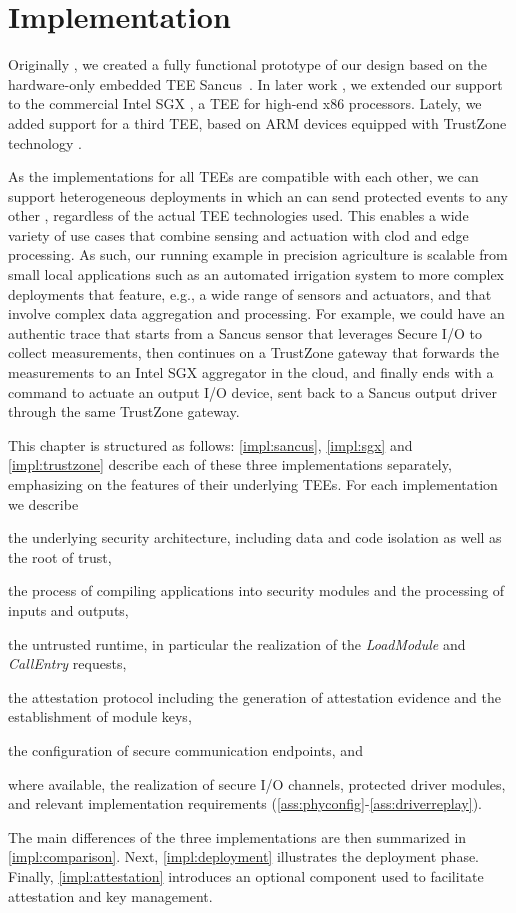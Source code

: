 \section{Implementation}
\label{sec:implementation}
%
Originally \cite{noorman:authentic-execution}, we created a fully functional
prototype of our design based on the hardware-only embedded \ac{TEE}
Sancus~\cite{sancus}. In later work \cite{scopelliti2020thesis}, we extended our
support to the commercial Intel \ac{SGX} \cite{sgx}, a \ac{TEE} for high-end x86
processors. Lately, we added support for a third \ac{TEE}, based on ARM devices
equipped with TrustZone technology \cite{alves:trustzone}.

As the implementations for all \acp{TEE} are compatible with each other, we can
support heterogeneous deployments in which an \protmod{} can send protected
events to any other \protmods{}, regardless of the actual \ac{TEE} technologies
used. This enables a wide variety of use cases that combine sensing and
actuation with clod and edge processing. As such, our running example in
precision agriculture is scalable from small local applications
such as an automated irrigation system to more complex deployments that
feature, e.g., a wide range of sensors and actuators, and that involve
complex data aggregation and processing. For example, we
could have an authentic trace that starts from a Sancus sensor that leverages
Secure I/O to collect measurements, then continues on a TrustZone gateway
that forwards the measurements to an Intel \ac{SGX} aggregator in the cloud, and
finally ends with a command to actuate an output I/O device, sent back to a
Sancus output driver through the same TrustZone gateway.

This chapter is structured as follows: \cref{impl:sancus}, \ref{impl:sgx} and
\ref{impl:trustzone} describe each of these three implementations separately,
emphasizing on the features of their underlying \acp{TEE}.  For each
implementation we describe
%
\begin{inparaenum}
\item the underlying security architecture, including data and code
  isolation as well as the root of trust,
\item the process of compiling applications into security modules and the
  processing of inputs and outputs,
\item the untrusted runtime, in particular the realization of the
  \emph{LoadModule} and \emph{CallEntry} requests,
\item the attestation protocol including the generation of attestation evidence
  and the establishment of module keys,
\item the configuration of secure communication endpoints, and
\item where available, the realization of secure I/O channels, protected
  driver modules, and relevant implementation
  requirements (\ref{ass:phyconfig}-\ref{ass:driverreplay}).
\end{inparaenum}
%
The main differences of the three implementations are then summarized in
\cref{impl:comparison}. Next, \cref{impl:deployment} illustrates the
deployment phase. Finally, \cref{impl:attestation} introduces an optional
component used to facilitate attestation and key management.


